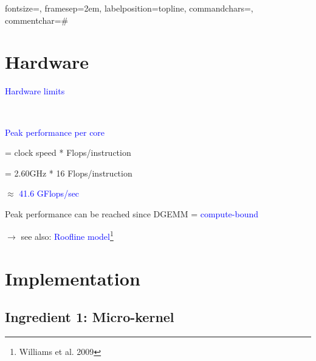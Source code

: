 \documentclass[11pt]{beamer}
\begin{document}
%
{fontsize=\scriptsize,
 framesep=2em, %
 labelposition=topline,
 commandchars=\|\(\), %
 commentchar=\#        %
}

\section{Hardware}

\begin{frame}[fragile]{\textcolor{blue}{Hardware limits}}

\begin{minipage}{0.42\textwidth}
\end{minipage}~
\begin{minipage}{0.49\textwidth}

\vspace{3.0cm}

\textcolor{blue}{Peak performance per core}

\quad= clock speed * Flops/instruction

\quad= 2.60GHz * 16 Flops/instruction

\quad$\approx$ \textcolor{blue}{41.6 GFlops/sec}

\vspace{0.5cm}

Peak performance can be reached  since DGEMM = \textcolor{blue}{compute-bound}


\quad $\rightarrow$ see also: \textcolor{blue}{Roofline model}\footnote{Williams et al. 2009}

\vspace{1.0cm}

\end{minipage}


\section{Implementation}

\subsection{Ingredient 1: Micro-kernel}

\end{frame}
\end{document}
